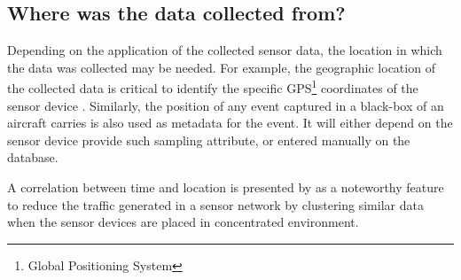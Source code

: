 \subsection{Where was the data collected from?}

Depending on the application of the collected sensor data, the location in
which the data was collected may be needed. For example, the geographic
location of the collected data is critical to identify the specific
GPS\footnote{Global Positioning System} coordinates of the sensor device
\cite{sn-ex02}. Similarly, the position of any  event captured in a black-box
of an aircraft carries is also used as metadata for the event. It will either
depend on the sensor device provide such sampling attribute, or entered
manually on the database.

A correlation between time and location is presented by \cite{sn-time-series}
as a noteworthy feature to reduce the traffic generated in a sensor network by
clustering similar data when the sensor devices are placed in concentrated environment.